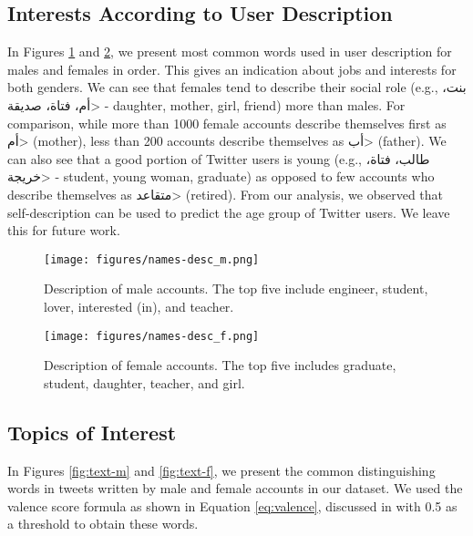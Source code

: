 \documentclass[sigconf,authorversion,nonacm]{acmart}
\begin{document}
\subsection{Interests According to User Description}
In Figures \ref{fig:names-desc-m} and \ref{fig:names-desc-f}, we present most common words used in user description for males and females in order. This gives an indication about jobs and interests for both genders. We can see that females tend to describe their social role (e.g., \<بنت، أم، فتاة، صديقة> - daughter, mother, girl, friend) more than males. For comparison, while more than 1000 female accounts describe themselves first as \<أم> (mother), less than 200 accounts describe themselves as \<أب> (father). We can also see that a good portion of Twitter users is young (e.g., \<طالب، فتاة، خريجة> - student, young woman, graduate) as opposed to few accounts who describe themselves as \<متقاعد> (retired). From our analysis, we observed that self-description can be used to predict the age group of Twitter users. We leave this for future work.

\begin{figure}[h]
	\begin{center}
		\texttt{[image: figures/names-desc\_m.png]} 
		\caption{Description of male accounts. The top five include engineer, student, lover, interested (in), and teacher.}
		\label{fig:names-desc-m}
	\end{center}
\end{figure}

\begin{figure}[h]
	\begin{center}
		\texttt{[image: figures/names-desc\_f.png]} 
		\caption{Description of female accounts. The top five includes graduate, student, daughter, teacher, and girl.}
		\label{fig:names-desc-f}
	\end{center}
\end{figure}


\subsection{Topics of Interest}
In Figures \ref{fig:text-m} and \ref{fig:text-f}, we present the common distinguishing words in tweets written by male and female accounts in our dataset. We used the valence score formula as shown in Equation \ref{eq:valence}, discussed in \cite{conover2011political,chowdhury2020multi} with 0.5 as a threshold to obtain these words. 
\end{document}
